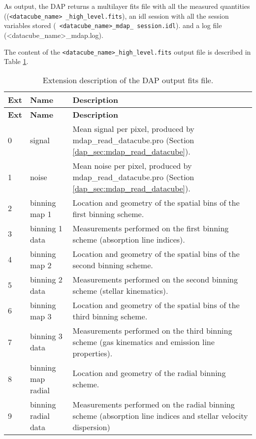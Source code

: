 As output, the DAP returns a multilayer fits file with all the
measured quantities (({\tt <datacube\_name> \_high\_level.fits}), an
idl session with all the session variables stored ({\tt
  <datacube\_name>\_mdap\_ session.idl}).  and a log file
(<datacube\_name>\_mdap.log).

The content of the {\tt <datacube\_name>\_high\_level.fits} output
file is described in Table \ref{dap_tab:output}.


\begin{center}
\begin{longtable}{p{0.5cm}|p{3.5cm}| p{10.1cm}}
\caption{Extension description of the DAP output fits file.} \label{dap_tab:output} \\
\hline
{\bf Ext} &  {\bf Name} &{\bf Description} \\
\hline
\endfirsthead
\hline
{\bf Ext} &  {\bf Name} &{\bf Description} \\
\hline
\endhead
\hline
\endlastfoot
\hline
0 & signal              & Mean signal per pixel, produced by mdap\_read\_datacube.pro (Section \ref{dap_sec:mdap_read_datacube}). \\
1 & noise               & Mean noise per pixel, produced by mdap\_read\_datacube.pro (Section \ref{dap_sec:mdap_read_datacube}).\\
2 & binning map 1       & Location and geometry of the spatial bins of the first binning scheme.\\ 
3 & binning 1 data      & Measurements performed on the first binning scheme (absorption line indices).\\ 
4 & binning map 2       & Location and geometry of the spatial bins of the second binning scheme.\\ 
5 & binning 2 data      & Measurements performed on the second binning scheme (stellar kinematics). \\ 
6 & binning map 3       & Location and geometry of the spatial bins of the third binning scheme.\\ 
7 & binning 3 data      & Measurements performed on the third binning scheme (gas kinematics and emission line properties).\\ 
8 & binning map radial  & Location and geometry of the radial binning scheme.\\ 
9 & binning radial data & Measurements performed on the radial binning scheme (absorption line indices and stellar velocity dispersion)  \\ 
\hline
\end{longtable}
\end{center}

